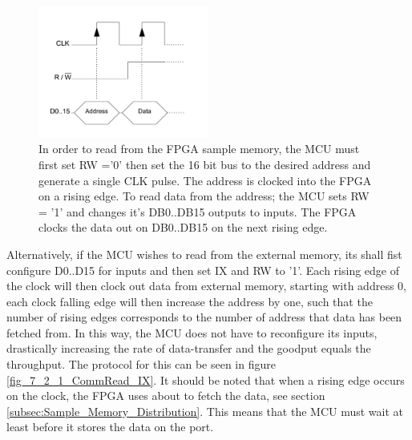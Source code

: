 \begin{figure}[H]
    \centering
    \includegraphics[clip, trim=0 50 0 0, width=0.5\textwidth]{Sections/7_SystemDesign/Figures/7_2_1_CommRead.pdf}
    \caption{In order to read from the FPGA sample memory, the MCU must first set RW ='0' then set the 16 bit bus to the desired address and generate a single CLK pulse. The address is clocked into the FPGA on a rising edge. To read data from the address; the MCU sets RW = '1' and changes it's DB0..DB15 outputs to inputs. The FPGA clocks the data out on DB0..DB15 on the next rising edge.}
    \label{fig_7_2_1_CommRead}
\end{figure}

Alternatively, if the MCU wishes to read from the external memory, its shall fist configure D0..D15 for inputs and then set IX and RW to '1'. Each rising edge of the clock will then clock out data from external memory, starting with address 0, each clock falling edge will then increase the address by one, such that the number of rising edges corresponds to the number of address that data has been fetched from. In this way, the MCU does not have to reconfigure its inputs, drastically increasing the rate of data-transfer and the goodput equals the throughput. The protocol for this can be seen in figure \ref{fig_7_2_1_CommRead_IX}. It should be noted that when a rising edge occurs on the clock, the FPGA uses about  to fetch the data, see section \ref{subsec:Sample_Memory_Distribution}. This means that the MCU must wait at least  before it stores the data on the port.

